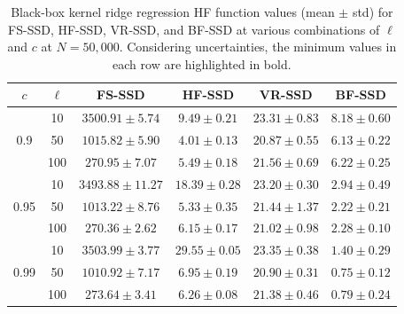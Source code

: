 \documentclass[10pt]{article} %
\numberwithin{equation}{section}
\theoremstyle{plain}
\theoremstyle{definition}
\newcommand{\<}{\langle}
\renewcommand{\>}{\rangle}
\renewcommand{\(}{\left(}
\renewcommand{\)}{\right)}
\renewcommand{\[}{\left[}
\renewcommand{\]}{\right]}
\begin{document}
\begin{table}[ht!]
    \centering
    \renewcommand{\arraystretch}{1.3}
    \begin{tabular}{cccccc}
        \toprule
        \textbf{$c$} & \textbf{$\ell$} & \textbf{FS-SSD} & \textbf{HF-SSD} & \textbf{VR-SSD} & \textbf{BF-SSD} \\ \midrule 
        \multirow{3}{*}{0.9}  
         & 10  & $3500.91 \pm 5.74$ & $9.49 \pm 0.21$ & $23.31 \pm 0.83$ & $\mathbf{8.18 \pm 0.60}$ \\ 
         & 50  & $1015.82 \pm 5.90$ & $\mathbf{4.01 \pm 0.13}$ & $20.87 \pm 0.55$ & $6.13 \pm 0.22$ \\ 
         & 100 & $270.95 \pm 7.07$ & $\mathbf{5.49 \pm 0.18}$ & $21.56 \pm 0.69$ & $6.22 \pm 0.25$ \\ 
         \midrule
        \multirow{3}{*}{0.95} 
         & 10  & $3493.88 \pm 11.27$ & $18.39 \pm 0.28$ & $23.20 \pm 0.30$ & $\mathbf{2.94 \pm 0.49}$ \\ 
         & 50  & $1013.22 \pm 8.76$ & $5.33 \pm 0.35$ & $21.44 \pm 1.37$ & $\mathbf{2.22 \pm 0.21}$ \\ 
         & 100 & $270.36 \pm 2.62$ & $6.15 \pm 0.17$ & $21.02 \pm 0.98$ & $\mathbf{2.28 \pm 0.10}$ \\ 
         \midrule
        \multirow{3}{*}{0.99} 
         & 10  & $3503.99 \pm 3.77$ & $29.55 \pm 0.05$ & $23.35 \pm 0.38$ & $\mathbf{1.40 \pm 0.29}$ \\ 
         & 50  & $1010.92 \pm 7.17$ & $6.95 \pm 0.19$ & $20.90 \pm 0.31$ & $\mathbf{0.75 \pm 0.12}$ \\ 
         & 100 & $273.64 \pm 3.41$ & $6.26 \pm 0.08$ & $21.38 \pm 0.46$ & $\mathbf{0.79 \pm 0.24}$ \\ 
         \bottomrule
    \end{tabular}
    \caption{Black-box kernel ridge regression HF function values (mean $\pm$ std) for FS-SSD, HF-SSD, VR-SSD, and BF-SSD at various combinations of $\ell$ and $c$ at $N=50,000$. Considering uncertainties, the minimum values in each row are highlighted in bold.}
    \label{tab:kernel_performance_table}
\end{table}
\end{document}
